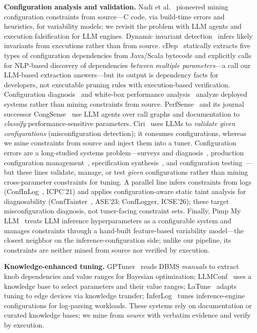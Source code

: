 \documentclass[journal]{IEEEtran}
\begin{document}
\textbf{Configuration analysis and validation.} Nadi et al.~\cite{ref20} pioneered mining configuration constraints from source---C code, via build-time errors and heuristics, for variability models; we revisit the problem with LLM agents and execution falsification for LLM engines. Dynamic invariant detection~\cite{daikon} infers likely invariants from executions rather than from source. cDep~\cite{ref5} statically extracts five types of configuration dependencies from Java/Scala bytecode and explicitly calls for NLP-based discovery of dependencies \emph{between multiple parameters}---a call our LLM-based extraction answers---but its output is dependency facts for developers, not executable pruning rules with execution-based verification. Configuration diagnosis~\cite{ref16} and white-box performance analysis~\cite{ref17} analyze deployed systems rather than mining constraints from source. PerfSense~\cite{ref3} and its journal successor CongSense~\cite{ref4} use LLM agents over call graphs and documentation to \emph{classify} performance-sensitive parameters. Ciri~\cite{ref21} uses LLMs to \emph{validate given configurations} (misconfiguration detection); it consumes configurations, whereas we mine constraints from source and inject them into a tuner. Configuration errors are a long-studied systems problem---surveys and diagnosis~\cite{xuszsurvey,yinsosp13}, production configuration management~\cite{tangsosp15}, specification synthesis~\cite{configv}, and configuration testing~\cite{ctest4j}---but these lines validate, manage, or test \emph{given} configurations rather than mining cross-parameter constraints for tuning. A parallel line infers constraints from logs (ConfInLog~\cite{confinlog}, ICPC'21) and applies configuration-aware static taint analysis for diagnosability (ConfTainter~\cite{conftainter}, ASE'23; ConfLogger, ICSE'26); these target misconfiguration diagnosis, not tuner-facing constraint sets. Finally, Pimp My LLM~\cite{pimpmyllm} treats LLM inference hyperparameters as a configurable system and manages constraints through a hand-built feature-based variability model---the closest neighbor on the inference-configuration side; unlike our pipeline, its constraints are neither mined from source nor verified by execution.

\textbf{Knowledge-enhanced tuning.} GPTuner~\cite{ref9} reads DBMS \emph{manuals} to extract knob dependencies and value ranges for Bayesian optimization; LLMConf~\cite{ref22} uses a knowledge base to select parameters and their value ranges; LaTune~\cite{ref23} adapts tuning to edge devices via knowledge transfer; InferLog~\cite{inferlog} tunes inference-engine configurations for log-parsing workloads. These systems rely on documentation or curated knowledge bases; we mine from \emph{source} with verbatim evidence and verify by execution.
\end{document}
